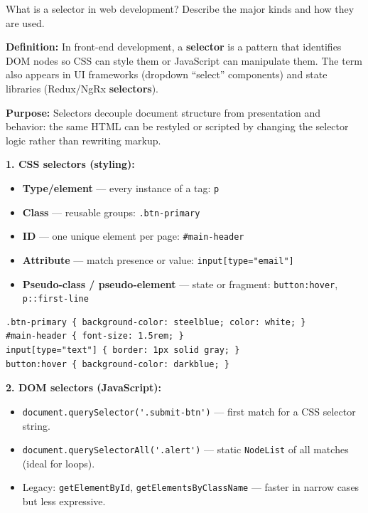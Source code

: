 \question[6]
What is a selector in web development? Describe the major kinds and how they are used.
\begin{solutionorbox}[5in]
\textbf{Definition:} In front-end development, a \textbf{selector} is a pattern that identifies DOM nodes so CSS can style them or JavaScript can manipulate them. The term also appears in UI frameworks (dropdown ``select'' components) and state libraries (Redux/NgRx \textbf{selectors}).

\textbf{Purpose:} Selectors decouple document structure from presentation and behavior: the same HTML can be restyled or scripted by changing the selector logic rather than rewriting markup.

\textbf{1. CSS selectors (styling):}
\begin{itemize}
  \item \textbf{Type/element} --- every instance of a tag: \lstinline[style=cssinline]|p|
  \item \textbf{Class} --- reusable groups: \lstinline[style=cssinline]|.btn-primary|
  \item \textbf{ID} --- one unique element per page: \lstinline[style=cssinline]|#main-header|
  \item \textbf{Attribute} --- match presence or value: \lstinline[style=cssinline]!input[type="email"]!
  \item \textbf{Pseudo-class / pseudo-element} --- state or fragment: \lstinline[style=cssinline]|button:hover|, \lstinline[style=cssinline]|p::first-line|
\end{itemize}

\begin{lstlisting}[style=css]
.btn-primary { background-color: steelblue; color: white; }
#main-header { font-size: 1.5rem; }
input[type="text"] { border: 1px solid gray; }
button:hover { background-color: darkblue; }
\end{lstlisting}

\textbf{2. DOM selectors (JavaScript):}
\begin{itemize}
  \item \lstinline[style=jsinline]!document.querySelector('.submit-btn')! --- first match for a CSS selector string.
  \item \lstinline[style=jsinline]!document.querySelectorAll('.alert')! --- static \lstinline[style=jsinline]|NodeList| of all matches (ideal for loops).
  \item Legacy: \lstinline[style=jsinline]|getElementById|, \lstinline[style=jsinline]|getElementsByClassName| --- faster in narrow cases but less expressive.
\end{itemize}


\end{solutionorbox}
